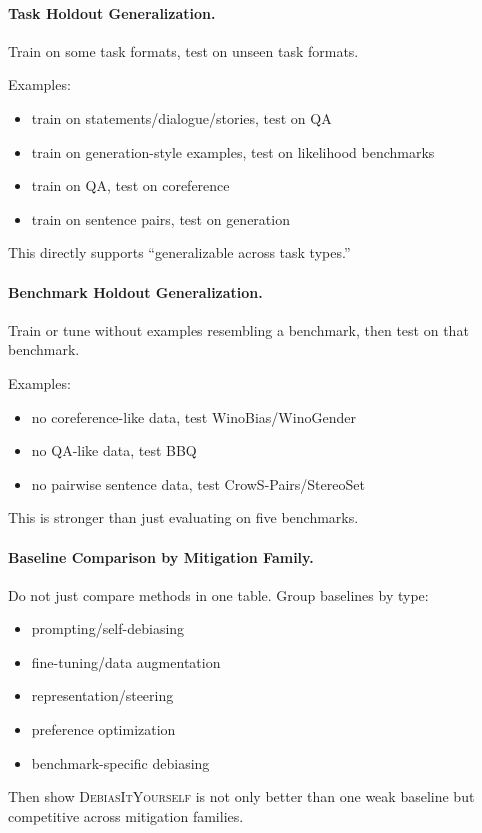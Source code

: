 \documentclass[11pt]{article}
\newcommand{\diy}{\textsc{DebiasItYourself}}
\begin{document}
\paragraph{Task Holdout Generalization.}
Train on some task formats, test on unseen task formats.

Examples:
\begin{itemize}[leftmargin=1.4em,itemsep=1pt,topsep=2pt]
    \item train on statements/dialogue/stories, test on QA
    \item train on generation-style examples, test on likelihood benchmarks
    \item train on QA, test on coreference
    \item train on sentence pairs, test on generation
\end{itemize}
This directly supports ``generalizable across task types.''

\paragraph{Benchmark Holdout Generalization.}
Train or tune without examples resembling a benchmark, then test on that benchmark.

Examples:
\begin{itemize}[leftmargin=1.4em,itemsep=1pt,topsep=2pt]
    \item no coreference-like data, test WinoBias/WinoGender
    \item no QA-like data, test BBQ
    \item no pairwise sentence data, test CrowS-Pairs/StereoSet
\end{itemize}
This is stronger than just evaluating on five benchmarks.

\paragraph{Baseline Comparison by Mitigation Family.}
Do not just compare methods in one table. Group baselines by type:
\begin{itemize}[leftmargin=1.4em,itemsep=1pt,topsep=2pt]
    \item prompting/self-debiasing
    \item fine-tuning/data augmentation
    \item representation/steering
    \item preference optimization
    \item benchmark-specific debiasing
\end{itemize}
Then show \diy{} is not only better than one weak baseline but competitive across mitigation families.
\end{document}
